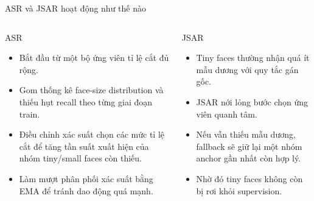 \documentclass[aspectratio=169,11pt]{beamer}
\begin{document}
\begin{frame}{ASR và JSAR hoạt động như thế nào}
  \begin{columns}[T,onlytextwidth]
    \begin{block}{ASR}
      \begin{itemize}
        \item Bắt đầu từ một bộ ứng viên tỉ lệ cắt đủ rộng.
        \item Gom thống kê face-size distribution và thiếu hụt recall theo từng giai đoạn train.
        \item Điều chỉnh xác suất chọn các mức tỉ lệ cắt để tăng tần suất xuất hiện của nhóm tiny/small faces còn thiếu.
        \item Làm mượt phân phối xác suất bằng EMA để tránh dao động quá mạnh.
      \end{itemize}
    \end{block}
    \begin{block}{JSAR}
      \begin{itemize}
        \item Tiny faces thường nhận quá ít mẫu dương với quy tắc gán gốc.
        \item JSAR nới lỏng bước chọn ứng viên quanh tâm.
        \item Nếu vẫn thiếu mẫu dương, fallback sẽ giữ lại một nhóm anchor gần nhất còn hợp lý.
        \item Nhờ đó tiny faces không còn bị rơi khỏi supervision.
      \end{itemize}
    \end{block}
  \end{columns}
\end{frame}
\end{document}

